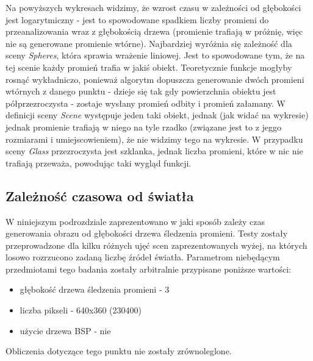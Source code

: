 Na powyższych wykresach widzimy, że wzrost czasu w zależności od głębokości jest logarytmiczny - jest to spowodowane spadkiem liczby promieni do przeanalizowania wraz z głębokością drzewa (promienie trafiają w próżnię, więc nie są generowane promienie wtórne). Najbardziej wyróżnia się zależność dla sceny \emph{Spheres}, która sprawia wrażenie liniowej. Jest to spowodowane tym, że na tej scenie każdy promień trafia w jakiś obiekt. Teoretycznie funkcje mogłyby rosnąć wykładniczo, ponieważ algorytm dopuszcza generowanie dwóch promieni wtórnych z danego punktu - dzieje się tak gdy powierzchnia obiektu jest półprzezroczysta - zostaje wysłany promień odbity i promień załamany. W definicji sceny \emph{Scene} występuje jeden taki obiekt, jednak (jak widać na wykresie) jednak promienie trafiają w niego na tyle rzadko (związane jest to z jeggo rozmiarami i umiejscowieniem), że nie widzimy tego na wykresie. W przypadku sceny \emph{Glass} przezroczysta jest szklanka, jednak liczba promieni, które w nic nie trafiają przeważa, powodując taki wygląd funkcji.

\subsection{Zależność czasowa od światła}

W niniejszym podrozdziale zaprezentowano w jaki sposób zależy czas generowania obrazu od głębokości drzewa śledzenia promieni. Testy zostały przeprowadzone dla kilku różnych ujęć scen zaprezentowanych wyżej, na których losowo rozrzucono zadaną liczbę źródeł światła. Parametrom niebędącym przedmiotami tego badania zostały arbitralnie przypisane poniższe wartości:

\begin{itemize}

\item głębokość drzewa śledzenia promieni - 3
\item liczba pikseli - 640x360 (230400)
\item użycie drzewa BSP - nie

\end{itemize}

Obliczenia dotyczące tego punktu nie zostały zrównoleglone.

